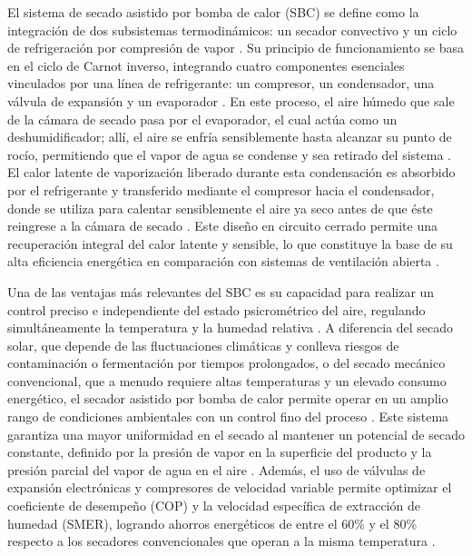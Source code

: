 El sistema de secado asistido por bomba de calor (SBC) se define como la integración de dos subsistemas termodinámicos: un secador convectivo y un ciclo de refrigeración por compresión de vapor \parencite{gomez-daza_innovacion_2023}. Su principio de funcionamiento se basa en el ciclo de Carnot inverso, integrando cuatro componentes esenciales vinculados por una línea de refrigerante: un compresor, un condensador, una válvula de expansión y un evaporador \parencite{fauzi_influence_2024, salehi_recent_2021}. En este proceso, el aire húmedo que sale de la cámara de secado pasa por el evaporador, el cual actúa como un deshumidificador; allí, el aire se enfría sensiblemente hasta alcanzar su punto de rocío, permitiendo que el vapor de agua se condense y sea retirado del sistema \parencite{salehi_recent_2021, dzaky_activation_2022}. El calor latente de vaporización liberado durante esta condensación es absorbido por el refrigerante y transferido mediante el compresor hacia el condensador, donde se utiliza para calentar sensiblemente el aire ya seco antes de que éste reingrese a la cámara de secado \parencite{salehi_recent_2021, yahya_development_2023}. Este diseño en circuito cerrado permite una recuperación integral del calor latente y sensible, lo que constituye la base de su alta eficiencia energética en comparación con sistemas de ventilación abierta \parencite{salehi_recent_2021}.

Una de las ventajas más relevantes del SBC es su capacidad para realizar un control preciso e independiente del estado psicrométrico del aire, regulando simultáneamente la temperatura y la humedad relativa \parencite{salehi_recent_2021, gomez-daza_innovacion_2023}. A diferencia del secado solar, que depende de las fluctuaciones climáticas y conlleva riesgos de contaminación o fermentación por tiempos prolongados, o del secado mecánico convencional, que a menudo requiere altas temperaturas y un elevado consumo energético, el secador asistido por bomba de calor permite operar en un amplio rango de condiciones ambientales con un control fino del proceso \parencite{salehi_recent_2021, cheng_evaluation_2019, dong_simulation_2022}. Este sistema garantiza una mayor uniformidad en el secado al mantener un potencial de secado constante, definido por la presión de vapor en la superficie del producto y la presión parcial del vapor de agua en el aire \parencite{gomez-daza_innovacion_2023}. Además, el uso de válvulas de expansión electrónicas y compresores de velocidad variable permite optimizar el coeficiente de desempeño (COP) y la velocidad específica de extracción de humedad (SMER), logrando ahorros energéticos de entre el 60\% y el 80\% respecto a los secadores convencionales que operan a la misma temperatura \parencite{salazar-hincapie_experimental_2020, salehi_recent_2021}.

